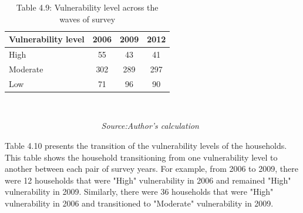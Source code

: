 \begin{table}[H]
	\captionsetup{labelformat=empty}
	\captionsetup{labelformat=empty, skip=-7pt} %
	\caption{{Table 4.9}: Vulnerability level across the waves of survey} 	\label{tab:Vulnerabilitylevels} 	\begin{center}
		\begin{tabular}{lccc} \hline
			\textbf{Vulnerability level} & \textbf{2006}            & \textbf{2009}            & \textbf{2012}           \\ \hline
			High                         & 55                       & 43                       & 41                      \\
			Moderate                     & 302                      & 289                      & 297                     \\
			Low                          & 71                       & 96                       & 90                \\ \hline \hline     
		\end{tabular}\\
	\end{center}\vspace{-8pt}
	\textit{\ \ \ \ \ \ \ \ \ \ \ \ \ \ \  \ \ \ \ \ \ \ \ Source:Author's calculation}
\end{table}

Table 4.10 presents the transition of the vulnerability levels of the households. This table shows the household transitioning from one vulnerability level to another between each pair of survey years. For example, from 2006 to 2009, there were 12 households that were "High" vulnerability in 2006 and remained "High" vulnerability in 2009. Similarly, there were 36 households that were "High" vulnerability in 2006 and transitioned to "Moderate" vulnerability in 2009.

